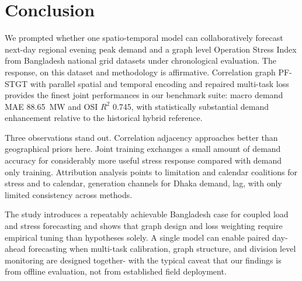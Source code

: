 \section{Conclusion}\label{sec:conclusion}

We prompted whether one spatio-temporal model can collaboratively forecast next-day regional evening peak demand and a graph level Operation Stress Index from Bangladesh national grid datasets under chronological evaluation. The response, on this dataset and methodology is affirmative. Correlation graph PF-STGT with parallel spatial and temporal encoding and repaired multi-task loss provides the finest joint performances in our benchmark suite: macro demand MAE 88.65~MW and OSI $R^2$ 0.745, with statistically substantial demand enhancement relative to the historical hybrid reference.

Three observations stand out. Correlation adjacency approaches better than geographical priors here. Joint training exchanges a small amount of demand accuracy for considerably more useful stress response compared with demand only training. Attribution analysis points to limitation and calendar coalitions for stress and to calendar, generation channels for Dhaka demand, lag, with only limited consistency across methods.

The study introduces a repeatably achievable Bangladesh case for coupled load and stress forecasting and shows that graph design and loss weighting require empirical tuning than hypotheses solely. A single model can enable paired day-ahead forecasting when multi-task calibration, graph structure, and division level monitoring are designed together- with the typical caveat that our findings is from offline evaluation, not from established field deployment. 
